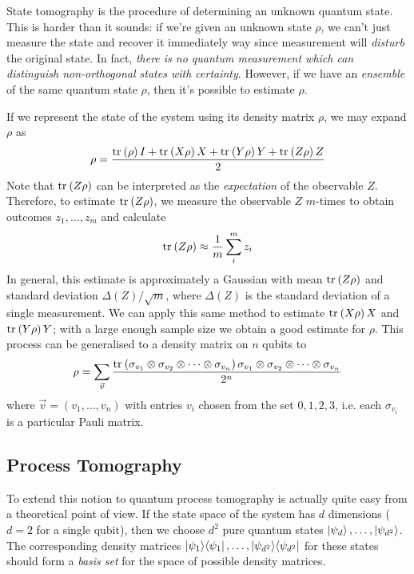 State tomography is the procedure of determining an unknown quantum state. This is harder than it
sounds: if we're given an unknown state $\rho$, we can't just measure the state and recover it
immediately way since measurement will \textit{disturb} the original state. In fact, \textit{there
is no quantum measurement which can distinguish non-orthogonal states with certainty}. However, if
we have an \textit{ensemble} of the same quantum state $\rho$, then it's possible to estimate
$\rho$.

If we represent the state of the system using its density matrix $\rho$, we may expand $\rho$ as
\begin{equation}
    \rho = \frac{\text{tr}_{}\left(\rho\right)I + \text{tr}_{}\left(X\rho\right)X + \text{tr}_{}\left(Y\rho\right)Y + \text{tr}_{}\left(Z\rho\right)Z}
                {2}
\end{equation}
Note that $\text{tr}_{}\left(Z\rho\right)$ can be interpreted as the \textit{expectation} of the observable $Z$.
Therefore, to estimate $\text{tr}_{}\left(Z\rho\right)$, we measure the observable $Z$ $m$-times to obtain outcomes
$z_1, \dots, z_m$ and calculate
\begin{equation}
    \text{tr}_{}\left(Z\rho\right) \approx \frac{1}{m} \sum_i^m z_i
\end{equation}
In general, this estimate is approximately a Gaussian with mean $\text{tr}_{}\left(Z\rho\right)$ and standard deviation
$\Delta(Z) / \sqrt{m}$, where $\Delta(Z)$ is the standard deviation of a single measurement. We can
apply this same method to estimate $\text{tr}_{}\left(X\rho\right)X$ and $\text{tr}_{}\left(Y\rho\right)Y$; with a large enough sample size
we obtain a good estimate for $\rho$. This process can be generalised to a density matrix on $n$
qubits to
\begin{equation}
    \rho = \sum_{\vec{v}} \frac{\text{tr}_{}\left(\sigma_{v_1} \otimes \sigma_{v_2} \otimes \dots \otimes \sigma_{v_n}\right) \sigma_{v_1} \otimes \sigma_{v_2} \otimes \dots \otimes \sigma_{v_n}}{2^n}
\end{equation}
where $\vec{v} = \left(v_1, \dots, v_n\right)$ with entries $v_i$ chosen from the set $0, 1, 2, 3$,
i.e. each $\sigma_{v_i}$ is a particular Pauli matrix.


\subsection{Process Tomography}

To extend this notion to quantum process tomography is actually quite easy from a theoretical point
of view. If the state space of the system has $d$ dimensions ($d = 2$ for a single qubit), then we
choose $d^2$ pure quantum states $\ket{\psi_d}, \dots, \ket{\psi_{d^2}}$. The corresponding density
matrices $\ket{\psi_1}\!\bra{\psi_1}, \dots, \ket{\psi_{d^2}}\!\bra{\psi_{d^2}}$ for these states should
form a \textit{basis set} for the space of possible density matrices. 

